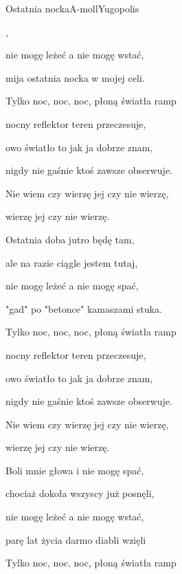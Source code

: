 \begin{song}{Ostatnia nocka}{A-moll}{}{Yugopolis}{}{}
  \begin{SBVerse}
      ,

     

    nie mogę leżeć a nie mogę wstać,

    mija ostatnia nocka w mojej celi.
  \end{SBVerse}
  \begin{SBVerse}
    Tylko noc, noc, noc, płoną światła ramp

    nocny reflektor teren przeczesuje,

    owo światło to jak ja dobrze znam,

    nigdy nie gaśnie ktoś zawsze obserwuje.
  \end{SBVerse}
  \begin{SBChorus}
    Nie wiem czy wierzę jej czy nie wierzę,

    wierzę jej czy nie wierzę.
  \end{SBChorus}
  \begin{SBVerse}
    Ostatnia doba jutro będę tam,

    ale na razie ciągle jestem tutaj,

    nie mogę leżeć a nie mogę spać,

    "gad" po "betonce" kamaszami stuka.
  \end{SBVerse}
  \begin{SBVerse}
    Tylko noc, noc, noc, płoną światła ramp

    nocny reflektor teren przeczesuje,

    owo światło to jak ja dobrze znam,

    nigdy nie gaśnie ktoś zawsze obserwuje.
  \end{SBVerse}
  \begin{SBChorus}
    Nie wiem czy wierzę jej czy nie wierzę,

    wierzę jej czy nie wierzę.
  \end{SBChorus}
  \begin{SBVerse}
    Boli mnie głowa i nie mogę spać,

    chociaż dokoła wszyscy już posnęli,

    nie mogę leżeć a nie mogę wstać,

    parę lat życia darmo diabli wzięli
  \end{SBVerse}
  \begin{SBVerse}
    Tylko noc, noc, noc, płoną światła ramp


\end{SBVerse}
\end{song}
